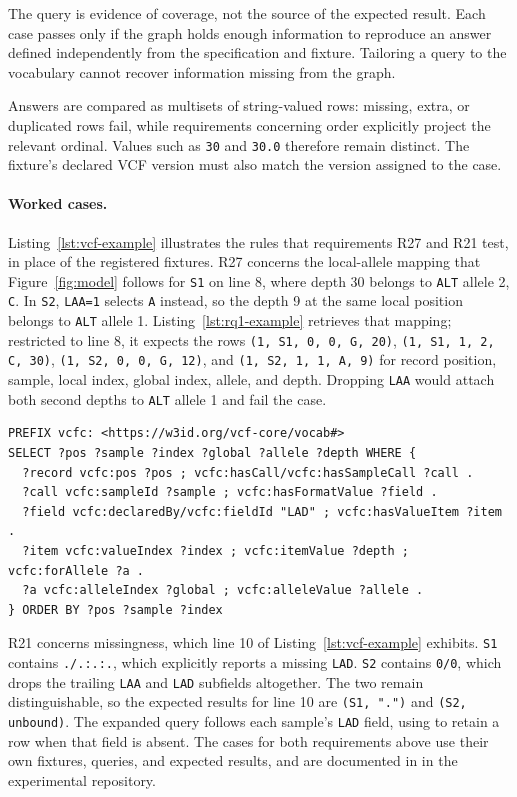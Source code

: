 The query is evidence of coverage, not the source of the expected result. 
Each case passes only if the graph holds enough information to reproduce an answer defined independently from the specification and fixture. 
Tailoring a query to the vocabulary cannot recover information missing from the graph.

Answers are compared as multisets of string-valued rows: missing, extra, or duplicated rows fail, while requirements concerning order explicitly project the relevant ordinal. 
Values such as \texttt{30} and \texttt{30.0} therefore remain distinct. 
The fixture's declared VCF version must also match the version assigned to the case.

\paragraph{Worked cases.}
Listing~\ref{lst:vcf-example} illustrates the rules that requirements R27 and R21 test, in place of the registered fixtures.
R27 concerns the local-allele mapping that Figure~\ref{fig:model} follows for \texttt{S1} on line 8, where depth 30 belongs to \texttt{ALT} allele 2, \texttt{C}.
In \texttt{S2}, \texttt{LAA=1} selects \texttt{A} instead, so the depth 9 at the same local position belongs to \texttt{ALT} allele 1.
Listing~\ref{lst:rq1-example} retrieves that mapping; restricted to line 8, it expects the rows \mbox{\texttt{(1, S1, 0, 0, G, 20)}}, \mbox{\texttt{(1, S1, 1, 2, C, 30)}}, \mbox{\texttt{(1, S2, 0, 0, G, 12)}}, and \mbox{\texttt{(1, S2, 1, 1, A, 9)}} for record position, sample, local index, global index, allele, and depth.
Dropping \texttt{LAA} would attach both second depths to \texttt{ALT} allele 1 and fail the case.

\begin{lstlisting}[float=htbp,caption={A query retrieving the local-to-global allele mapping that R27 tests.},label={lst:rq1-example}]
PREFIX vcfc: <https://w3id.org/vcf-core/vocab#>
SELECT ?pos ?sample ?index ?global ?allele ?depth WHERE {
  ?record vcfc:pos ?pos ; vcfc:hasCall/vcfc:hasSampleCall ?call .
  ?call vcfc:sampleId ?sample ; vcfc:hasFormatValue ?field .
  ?field vcfc:declaredBy/vcfc:fieldId "LAD" ; vcfc:hasValueItem ?item .
  ?item vcfc:valueIndex ?index ; vcfc:itemValue ?depth ; vcfc:forAllele ?a .
  ?a vcfc:alleleIndex ?global ; vcfc:alleleValue ?allele .
} ORDER BY ?pos ?sample ?index
\end{lstlisting}

R21 concerns missingness, which line 10 of Listing~\ref{lst:vcf-example} exhibits.
\texttt{S1} contains \texttt{./.:.:.}, which explicitly reports a missing \texttt{LAD}. 
\texttt{S2} contains \texttt{0/0}, which drops the trailing \texttt{LAA} and \texttt{LAD} subfields altogether.
The two remain distinguishable, so the expected results for line 10 are \texttt{(S1, ".")} and \texttt{(S2, unbound)}.
The expanded query follows each sample's \texttt{LAD} field, using  to retain a row when that field is absent.
The cases for both requirements above use their own fixtures, queries, and expected results, and are documented in \href{https://github.com/ecrum19/SWAT4HCLS_2027/tree/main/RQ1/methodology}{} in the experimental repository.

